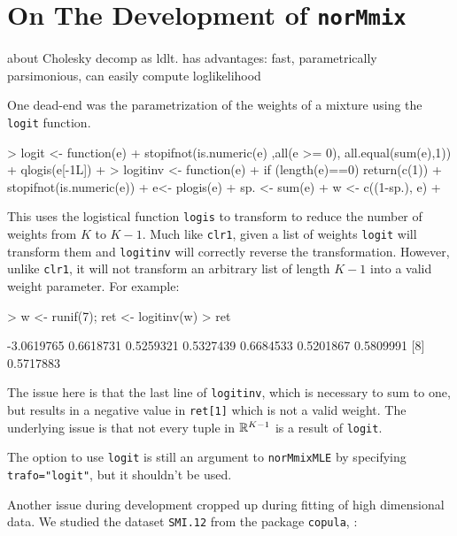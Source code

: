 \section{On The Development of {\tt norMmix}}
\label{sec:devel}

about Cholesky decomp as ldlt. has advantages: fast, parametrically 
parsimonious, can easily compute loglikelihood


One dead-end was the parametrization of the weights of a mixture using the 
{\tt logit} function.

\begin{Schunk}
\begin{Sinput}
> logit <- function(e) {
+     stopifnot(is.numeric(e) ,all(e >= 0), all.equal(sum(e),1))
+     qlogis(e[-1L])
+ }
> logitinv <- function(e) {
+     if (length(e)==0) {return(c(1))}
+     stopifnot(is.numeric(e))
+     e<- plogis(e)
+     sp. <- sum(e)
+     w <- c((1-sp.), e)
+ }
\end{Sinput}
\end{Schunk}

This uses the logistical function {\tt logis} to transform to reduce the number
of weights from $K$ to $K-1$. Much like {\tt clr1}, given a list of weights 
{\tt logit} will transform them and {\tt logitinv} will correctly reverse the 
transformation. However, unlike {\tt clr1}, it will not transform an arbitrary 
list of length $K-1$ into a valid weight parameter. For example:

\begin{Schunk}
\begin{Sinput}
> w <- runif(7); ret <- logitinv(w)
> ret
\end{Sinput}
\begin{Soutput}
[1] -3.0619765  0.6618731  0.5259321  0.5327439  0.6684533  0.5201867  0.5809991
[8]  0.5717883
\end{Soutput}
\end{Schunk}

The issue here is that the last line of {\tt logitinv}, which is necessary to 
sum to one, but results in a negative value in {\tt ret[1]} which is not a 
valid weight. The underlying issue is that not every tuple in $\mathbb{R}^{K-1}$ is 
a result of {\tt logit}.

The option to use {\tt logit} is still an argument to {\tt norMmixMLE} by 
specifying {\tt trafo="logit"}, but it shouldn't be used.



Another issue during development cropped up during fitting of high dimensional
data. We studied the dataset {\tt SMI.12} from the package {\tt copula}, 
\cite{cop18}:

